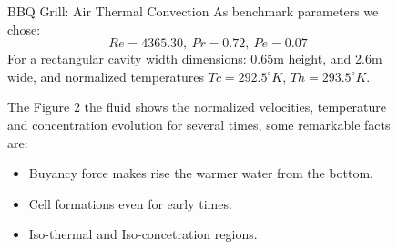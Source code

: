 \documentclass[final]{beamer}
\newlength{\sepwid}
\newlength{\onecolwid}
\newlength{\twocolwid}
\begin{document}
\begin{frame}[t]
\begin{columns}[t]
\begin{column}{\onecolwid}
\end{column} %

\begin{column}{\sepwid}\end{column} %

\begin{column}{\twocolwid} %

\begin{columns}[t,totalwidth=\twocolwid] %

\begin{column}{\onecolwid}\vspace{-.6in} %


\begin{block}{BBQ Grill: Air Thermal Convection}
	As benchmark parameters we chose:
	$$Re=4365.30, \: Pr=0.72, \: Pe=0.07$$
	For a rectangular cavity width dimensions: 0.65m height, and 2.6m wide, and normalized temperatures $Tc=292.5^{\circ}K$, $Th=293.5^{\circ}K$.

	\vspace{1em}
	The Figure 2 the fluid shows the normalized velocities, temperature and concentration evolution for several times, some remarkable facts are:
	\begin{itemize}
		\item Buyancy force makes rise the warmer water from the bottom.
		\item Cell formations even for early times.
		\item Iso-thermal and Iso-concetration regions.
	\end{itemize}
\end{block}


\end{column} %

\begin{column}{\onecolwid}\vspace{-.6in} %



\end{column}
\end{columns}
\end{column}
\end{columns}
\end{frame}
\end{document}
